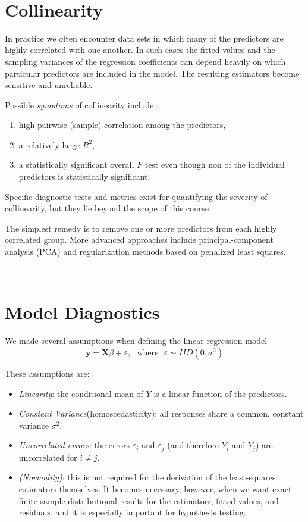 \documentclass[
]{book}
\begin{document}
~

\section{Collinearity}\label{collinearity}

In practice we often encounter data sets in which many of the predictors are highly correlated with one another. In such cases the fitted values and the sampling variances of the regression coefficients can depend heavily on which particular predictors are included in the model. The resulting estimators become sensitive and unreliable.

Possible \emph{symptoms} of collinearity include :

\begin{enumerate}
\def\labelenumi{(\roman{enumi})}
\item
  high pairwise (sample) correlation among the predictors,
\item
  a relatively large \(R^2\),
\item
  a statistically significant overall \(F\) test even though non of the individual predictors is statistically significant.
\end{enumerate}

Specific diagnostic tests and metrics exist for quantifying the severity of collinearity, but they lie beyond the scope of this course.

The simplest remedy is to remove one or more predictors from each highly correlated group. More advanced approaches include principal-component analysis (PCA) and regularization methods based on penalized least squares.

~

\section{Model Diagnostics}\label{model-diagnostics}

We made several assumptions when defining the linear regression model
\[\mathbf{y} =  \mathbf{X}\beta + \varepsilon,\,\, \text{ where } \,\, \varepsilon \sim IID(0, \sigma^2)\]

These assumptions are:

\begin{itemize}
\item
  \emph{Linearity}: the conditional mean of \(Y\) is a linear function of the predictors.
\item
  \emph{Constant Variance}(homoscedasticity): all responses share a common, constant variance \(\sigma^2\).
\item
  \emph{Uncorrelated errors}: the errors \(\varepsilon_i\) and \(\varepsilon_j\) (and therefore \(Y_i\) and \(Y_j\)) are uncorrelated for \(i\neq j\).
\item
  \emph{(Normality)}: this is not required for the derivation of the least-squares estimators themselves. It becomes necessary, however, when we want exact finite-sample distributional results for the estimators, fitted values, and residuals, and it is especially important for hypothesis testing.
\end{itemize}
\end{document}

